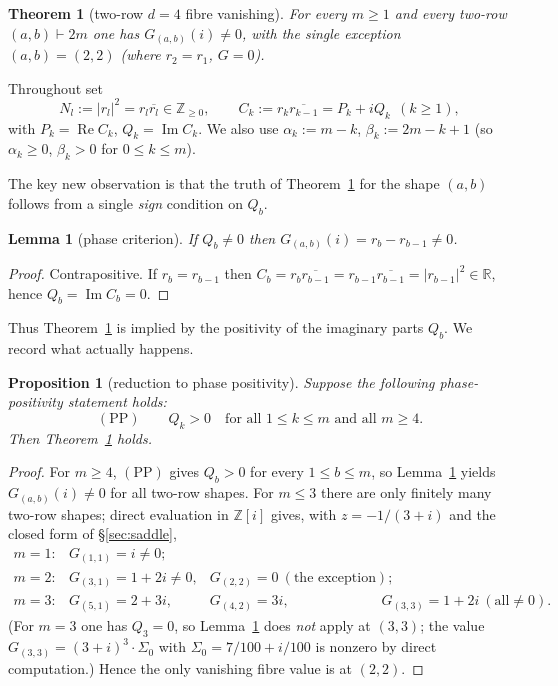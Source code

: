 \documentclass[11pt]{article}
\newtheorem{theorem}{Theorem}
\newtheorem{proposition}{Proposition}
\newtheorem{lemma}{Lemma}
\theoremstyle{definition}
\newcommand{\Z}{\mathbb{Z}}
\newcommand{\R}{\mathbb{R}}
\newcommand{\Zi}{\Z[i]}
\renewcommand{\Re}{\operatorname{Re}}
\renewcommand{\Im}{\operatorname{Im}}
\begin{document}
\begin{theorem}[two-row $d=4$ fibre vanishing]\label{thm:main}
For every $m\ge1$ and every two-row $(a,b)\vdash2m$ one has $G_{(a,b)}(i)\neq0$,
with the single exception $(a,b)=(2,2)$ (where $r_2=r_1$, $G=0$).
\end{theorem}

Throughout set
\[
  N_l:=|r_l|^2=r_l\overline{r_l}\in\Z_{\ge0},\qquad
  C_k:=r_k\overline{r_{k-1}}=P_k+iQ_k\ \ (k\ge1),
\]
with $P_k=\Re C_k$, $Q_k=\Im C_k$.  We also use $\alpha_k:=m-k$,
$\beta_k:=2m-k+1$ (so $\alpha_k\ge0$, $\beta_k>0$ for $0\le k\le m$).

The key new observation is that the truth of Theorem~\ref{thm:main} for the shape
$(a,b)$ follows from a single \emph{sign} condition on $Q_b$.

\begin{lemma}[phase criterion]\label{lem:phase}
If $Q_b\neq0$ then $G_{(a,b)}(i)=r_b-r_{b-1}\neq0$.
\end{lemma}
\begin{proof}
Contrapositive.  If $r_b=r_{b-1}$ then
$C_b=r_b\overline{r_{b-1}}=r_{b-1}\overline{r_{b-1}}=|r_{b-1}|^2\in\R$, hence
$Q_b=\Im C_b=0$.
\end{proof}

Thus Theorem~\ref{thm:main} is implied by the positivity of the imaginary parts
$Q_b$.  We record what actually happens.

\begin{proposition}[reduction to phase positivity]\label{prop:reduction}
Suppose the following \emph{phase-positivity statement} holds:
\[
  (\mathrm{PP})\qquad Q_k>0\quad\text{for all } 1\le k\le m \text{ and all } m\ge4 .
\]
Then Theorem~\ref{thm:main} holds.
\end{proposition}
\begin{proof}
For $m\ge4$, $(\mathrm{PP})$ gives $Q_b>0$ for every $1\le b\le m$, so
Lemma~\ref{lem:phase} yields $G_{(a,b)}(i)\neq0$ for all two-row shapes.  For
$m\le3$ there are only finitely many two-row shapes; direct evaluation in $\Zi$
gives, with $z=-1/(3+i)$ and the closed form of \S\ref{sec:saddle},
\[
\begin{array}{llll}
 m=1: & G_{(1,1)}=i\neq0; \\[2pt]
 m=2: & G_{(3,1)}=1+2i\neq0, & G_{(2,2)}=0 \ (\text{the exception}); \\[2pt]
 m=3: & G_{(5,1)}=2+3i,\ & G_{(4,2)}=3i,\ & G_{(3,3)}=1+2i\ (\text{all}\neq0).
\end{array}
\]
(For $m=3$ one has $Q_3=0$, so Lemma~\ref{lem:phase} does \emph{not} apply at
$(3,3)$; the value $G_{(3,3)}=(3+i)^3\cdot\Sigma_0$ with $\Sigma_0=7/100+i/100$ is
nonzero by direct computation.)  Hence the only vanishing fibre value is at
$(2,2)$.
\end{proof}
\end{document}
